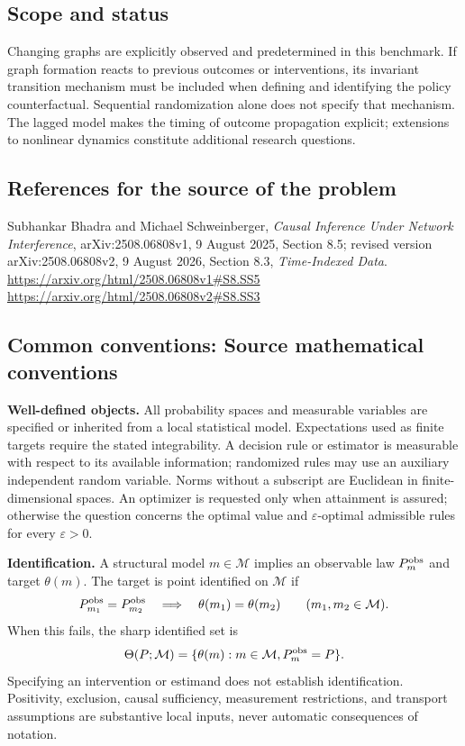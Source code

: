 \documentclass[11pt,a4paper]{article}
\begin{document}
\subsection*{Scope and status}
Changing graphs are explicitly observed and predetermined in this benchmark. If graph formation reacts to previous outcomes or interventions, its invariant transition mechanism must be included when defining and identifying the policy counterfactual. Sequential randomization alone does not specify that mechanism. The lagged model makes the timing of outcome propagation explicit; extensions to nonlinear dynamics constitute additional research questions.
\subsection*{References for the source of the problem}
Subhankar Bhadra and Michael Schweinberger, \emph{Causal Inference Under Network Interference}, arXiv:2508.06808v1, 9 August 2025, Section 8.5; revised version arXiv:2508.06808v2, 9 August 2026, Section 8.3, \emph{Time-Indexed Data}.
\url{https://arxiv.org/html/2508.06808v1#S8.SS5}
\url{https://arxiv.org/html/2508.06808v2#S8.SS3}

\subsection*{Common conventions: Source mathematical conventions}

\textbf{Well-defined objects.}
All probability spaces and measurable variables are specified or inherited
from a local statistical model. Expectations used as finite targets require
the stated integrability. A decision rule or estimator is measurable with
respect to its available information; randomized rules may use an auxiliary
independent random variable. Norms without a subscript are Euclidean in
finite-dimensional spaces. An optimizer is requested only when attainment
is assured; otherwise the question concerns the optimal value and
$\varepsilon$-optimal admissible rules for every $\varepsilon>0$.

\textbf{Identification.}
A structural model $m\in\mathcal M$ implies an observable law
$P_m^{\rm obs}$ and target $\theta(m)$. The target is point identified on
$\mathcal M$ if
\[
 P_{m_1}^{\rm obs}=P_{m_2}^{\rm obs}
 \quad\Longrightarrow\quad\theta(m_1)=\theta(m_2)
 \qquad(m_1,m_2\in\mathcal M).
\]
When this fails, the sharp identified set is
\[
 \Theta(P;\mathcal M)=\{\theta(m):m\in\mathcal M,
                                  P_m^{\rm obs}=P\}.
\]
Specifying an intervention or estimand does not establish identification.
Positivity, exclusion, causal sufficiency, measurement restrictions, and
transport assumptions are substantive local inputs, never automatic
consequences of notation.
\end{document}
